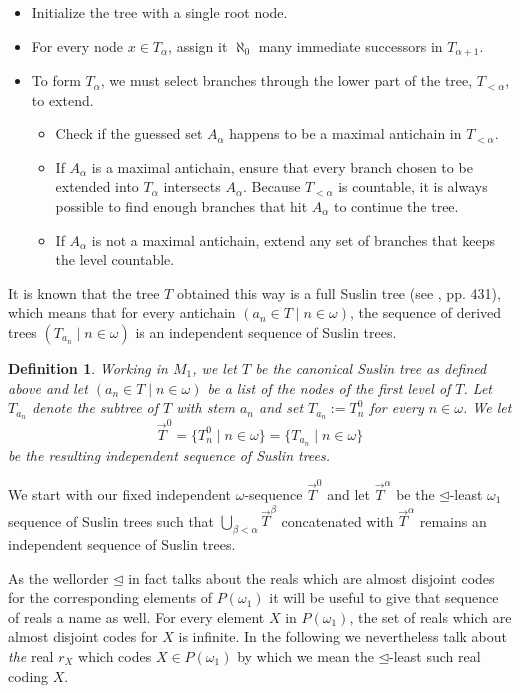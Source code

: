 \documentclass[a4paper,11pt]{article}
\newtheorem{definition}[theorem]{Definition}
\begin{document}
\begin{itemize}
    \item Initialize the tree with a single root node.
    \item  For every node $x \in T_\alpha$, assign it $\aleph_0$ many immediate successors in $T_{\alpha+1}$.
    \item  To form $T_\alpha$, we must select branches through the lower part of the tree, $T_{<\alpha}$, to extend. 
    \begin{itemize}
        \item Check if the guessed set $A_\alpha$ happens to be a maximal antichain in $T_{<\alpha}$.
        \item If $A_\alpha$ is a maximal antichain, ensure that every branch chosen to be extended into $T_\alpha$ intersects $A_\alpha$. Because $T_{<\alpha}$ is countable, it is always possible to find enough branches that hit $A_\alpha$ to continue the tree.
        \item If $A_\alpha$ is not a maximal antichain, extend any set of branches that keeps the level countable.
    \end{itemize}
\end{itemize}
It is known that the tree $T$ obtained this way is a full Suslin tree (see \cite{fuchs2009degrees}, pp. 431), which means that for every antichain $(a_n \in T \mid n \in \omega)$, the sequence of derived trees $(T_{a_n} \mid n \in \omega)$ is an independent sequence of Suslin trees. 
\begin{definition}
    Working in $M_1$, we let $T$ be the canonical Suslin tree as defined above and let $(a_n \in T \mid n \in\omega)$ be a list of the nodes of the first level of $T$. Let $T_{a_n}$ denote the subtree of $T$ with stem $a_n$ and set $T_{a_n} := T^0_n$ for every $n \in \omega$. We let \[\vec{T}^0= \{ T^0_n \mid n \in \omega \}=\{ T_{a_n} \mid n \in \omega\}\] be the resulting independent sequence of Suslin trees.
\end{definition}
We start with our fixed independent $\omega$-sequence $\vec{T}^0$ and let $\vec{T}^{\alpha}$ be the $\unlhd$-least $\omega_1$ sequence of Suslin trees such that $\bigcup_{\beta < \alpha} \vec{T}^{\beta}$ concatenated with $\vec{T}^{\alpha}$ remains an independent sequence of Suslin trees.

As the wellorder $\unlhd$ in fact talks about the reals which are almost disjoint codes for the corresponding elements of $P(\omega_1)$ it will be useful to give that sequence of reals a name as well. For every element $X$ in $P(\omega_1)$, the set of reals which are almost disjoint codes for $X$ is infinite. In the following we nevertheless talk about \emph{the} real $r_X$ which codes $X \in P(\omega_1)$ by which we mean the $\unlhd$-least such real coding $X$.
\end{document}

